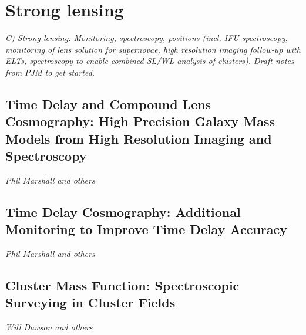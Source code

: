 \section{Strong lensing}
\label{sec:sl}

{\em C) Strong lensing: Monitoring, spectroscopy, positions (incl. IFU
spectroscopy, monitoring of lens solution for supernovae, high
resolution imaging follow-up with ELTs, spectroscopy to enable combined
SL/WL analysis of clusters). Draft notes from PJM to get started.}

\subsection{Time Delay and Compound Lens Cosmography: High Precision Galaxy Mass Models from High Resolution Imaging and Spectroscopy}
{\it Phil Marshall and others}


\subsection{Time Delay Cosmography: Additional Monitoring to Improve Time Delay Accuracy}
{\it Phil Marshall and others}


\subsection{Cluster Mass Function: Spectroscopic Surveying in Cluster Fields}
{\it Will Dawson and others}
